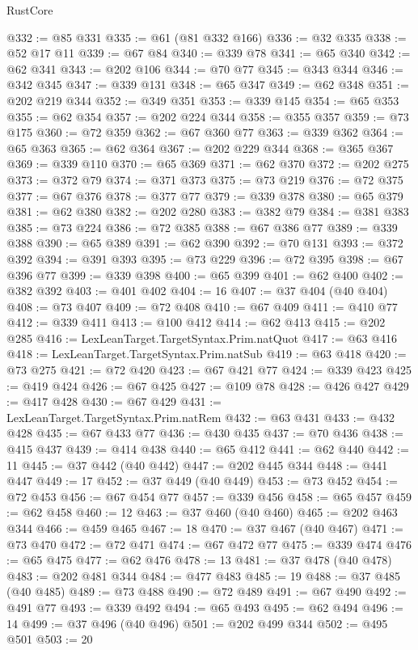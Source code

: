 \begin{lexlean}{RustCore}
\begin{coremodule}
@332 := @85 @331
@335 := @61 (@81 @332 @166)
@336 := @32 @335
@338 := @52 @17 @11
@339 := @67 @84
@340 := @339 @78
@341 := @65 @340
@342 := @62 @341
@343 := @202 @106
@344 := @70 @77
@345 := @343 @344
@346 := @342 @345
@347 := @339 @131
@348 := @65 @347
@349 := @62 @348
@351 := @202 @219 @344
@352 := @349 @351
@353 := @339 @145
@354 := @65 @353
@355 := @62 @354
@357 := @202 @224 @344
@358 := @355 @357
@359 := @73 @175
@360 := @72 @359
@362 := @67 @360 @77
@363 := @339 @362
@364 := @65 @363
@365 := @62 @364
@367 := @202 @229 @344
@368 := @365 @367
@369 := @339 @110
@370 := @65 @369
@371 := @62 @370
@372 := @202 @275
@373 := @372 @79
@374 := @371 @373
@375 := @73 @219
@376 := @72 @375
@377 := @67 @376
@378 := @377 @77
@379 := @339 @378
@380 := @65 @379
@381 := @62 @380
@382 := @202 @280
@383 := @382 @79
@384 := @381 @383
@385 := @73 @224
@386 := @72 @385
@388 := @67 @386 @77
@389 := @339 @388
@390 := @65 @389
@391 := @62 @390
@392 := @70 @131
@393 := @372 @392
@394 := @391 @393
@395 := @73 @229
@396 := @72 @395
@398 := @67 @396 @77
@399 := @339 @398
@400 := @65 @399
@401 := @62 @400
@402 := @382 @392
@403 := @401 @402
@404 := 16
@407 := @37 @404 (@40 @404)
@408 := @73 @407
@409 := @72 @408
@410 := @67 @409
@411 := @410 @77
@412 := @339 @411
@413 := @100 @412
@414 := @62 @413
@415 := @202 @285
@416 := LexLeanTarget.TargetSyntax.Prim.natQuot
@417 := @63 @416
@418 := LexLeanTarget.TargetSyntax.Prim.natSub
@419 := @63 @418
@420 := @73 @275
@421 := @72 @420
@423 := @67 @421 @77
@424 := @339 @423
@425 := @419 @424
@426 := @67 @425
@427 := @109 @78
@428 := @426 @427
@429 := @417 @428
@430 := @67 @429
@431 := LexLeanTarget.TargetSyntax.Prim.natRem
@432 := @63 @431
@433 := @432 @428
@435 := @67 @433 @77
@436 := @430 @435
@437 := @70 @436
@438 := @415 @437
@439 := @414 @438
@440 := @65 @412
@441 := @62 @440
@442 := 11
@445 := @37 @442 (@40 @442)
@447 := @202 @445 @344
@448 := @441 @447
@449 := 17
@452 := @37 @449 (@40 @449)
@453 := @73 @452
@454 := @72 @453
@456 := @67 @454 @77
@457 := @339 @456
@458 := @65 @457
@459 := @62 @458
@460 := 12
@463 := @37 @460 (@40 @460)
@465 := @202 @463 @344
@466 := @459 @465
@467 := 18
@470 := @37 @467 (@40 @467)
@471 := @73 @470
@472 := @72 @471
@474 := @67 @472 @77
@475 := @339 @474
@476 := @65 @475
@477 := @62 @476
@478 := 13
@481 := @37 @478 (@40 @478)
@483 := @202 @481 @344
@484 := @477 @483
@485 := 19
@488 := @37 @485 (@40 @485)
@489 := @73 @488
@490 := @72 @489
@491 := @67 @490
@492 := @491 @77
@493 := @339 @492
@494 := @65 @493
@495 := @62 @494
@496 := 14
@499 := @37 @496 (@40 @496)
@501 := @202 @499 @344
@502 := @495 @501
@503 := 20

\end{coremodule}
\end{lexlean}
